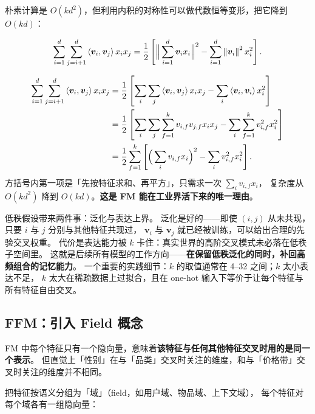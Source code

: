 朴素计算是 $O(k d^2)$，但利用内积的对称性可以做代数恒等变形，把它降到 $O(k d)$：

\begin{equation}
\sum_{i=1}^{d}\sum_{j=i+1}^{d} \left\langle \bm{v}_i, \bm{v}_j \right\rangle x_i x_j
= \frac{1}{2}\left[ \Big\| \sum_{i=1}^{d} \bm{v}_i x_i \Big\|^2
- \sum_{i=1}^{d} \left\lVert \bm{v}_i \right\rVert^2 x_i^2 \right] .
\label{eq:fm-linear}
\end{equation}

\begin{formulacard}
\begin{align}
\sum_{i=1}^{d}\sum_{j=i+1}^{d} \left\langle \bm{v}_i, \bm{v}_j \right\rangle x_i x_j
&= \frac{1}{2}\left[ \sum_{i}\sum_{j} \left\langle \bm{v}_i, \bm{v}_j \right\rangle x_i x_j
   - \sum_{i} \left\langle \bm{v}_i, \bm{v}_i \right\rangle x_i^2 \right] \notag \\
&= \frac{1}{2}\left[ \sum_{i}\sum_{j}\sum_{f=1}^{k} v_{i,f} v_{j,f} x_i x_j
   - \sum_{i}\sum_{f=1}^{k} v_{i,f}^2 x_i^2 \right] \notag \\
&= \frac{1}{2}\sum_{f=1}^{k}\left[ \Big(\sum_{i} v_{i,f} x_i\Big)^2
   - \sum_{i} v_{i,f}^2 x_i^2 \right] .
\label{eq:fm-expand}
\end{align}
方括号内第一项是「先按特征求和、再平方」，只需求一次 $\sum_i v_{i,f} x_i$，
复杂度从 $O(kd^2)$ 降到 $O(kd)$。\textbf{这是 FM 能在工业界活下来的唯一理由}。
\end{formulacard}

\begin{insight}[低秩假设的代价]
低秩假设带来两件事：泛化与表达上界。
泛化是好的——即使 $(i,j)$ 从未共现，只要 $i$ 与 $j$ 分别与其他特征共现过，
$\bm{v}_i$ 与 $\bm{v}_j$ 就已经被训练，可以给出合理的先验交叉权重。
代价是表达能力被 $k$ 卡住：真实世界的高阶交叉模式未必落在低秩子空间里。
这就是后续所有模型的工作方向——\textbf{在保留低秩泛化的同时，补回高频组合的记忆能力}。
一个重要的实践细节：$k$ 的取值通常在 4--32 之间；$k$ 太小表达不足，
$k$ 太大在稀疏数据上过拟合，且在 one-hot 输入下等价于让每个特征与所有特征自由交叉。
\end{insight}

\subsection{FFM：引入 Field 概念}

FM 中每个特征只有一个隐向量，意味着\textbf{该特征与任何其他特征交叉时用的是同一个表示}。
但直觉上「性别」在与「品类」交叉时关注的维度，和与「价格带」交叉时关注的维度并不相同。

 \cite{juan2017ffm}
把特征按语义分组为「域」（field，如用户域、物品域、上下文域），
每个特征对每个域各有一组隐向量：

